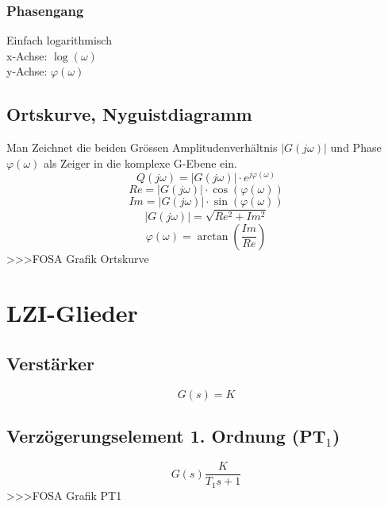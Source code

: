 \subsubsection{Phasengang}
Einfach logarithmisch\\
x-Achse: $\log(\omega)$ \\
y-Achse: $\varphi(\omega)$ \\

\subsection{Ortskurve, Nyguistdiagramm}
Man Zeichnet die beiden Grössen Amplitudenverhältnis $|G(j \omega)|$ und 
Phase $\varphi(\omega)$ als Zeiger in die komplexe G-Ebene ein. 
\[ Q(j \omega) = |G(j \omega)| \cdot e^{j \varphi(\omega)} \]
\[ Re =  |G(j \omega)| \cdot \cos(\varphi(\omega)) \]
\[ Im =  |G(j \omega)| \cdot \sin(\varphi(\omega)) \]
\[ |G(j \omega)| = \sqrt{Re^2 + Im^2} \]
\[ \varphi(\omega) = \arctan(\frac{Im}{Re}) \]
>>>FOSA Grafik Ortskurve \\

\section{LZI-Glieder}

\subsection{Verstärker}
\[ G(s) = K \]

\subsection{Verzögerungselement 1. Ordnung (PT$_1$)}
\[ G(s) \frac{K}{T_1 s + 1} \]
>>>FOSA Grafik PT1

